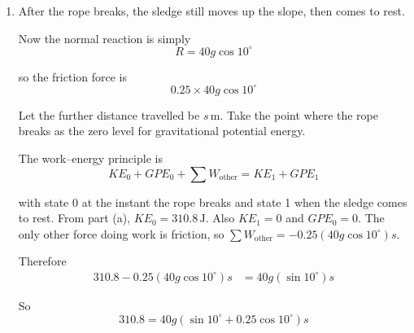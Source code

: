 \documentclass[leqno]{article}
\begin{document}
\begin{enumerate}[
  label=\textbf{\arabic*.},
  leftmargin=*,
  topsep=0pt,
  partopsep=0pt,
  parsep=0pt
]
\begin{djsSolution}
\begin{enumerate}[label=\textbf{(\alph*)}]
  So
  \begin{align*}
  0+0+220(5)\cos 15^\circ -0.25R(5)
  &= \frac12(40)v^2 + 40g(5)\sin 10^\circ
  \end{align*}

  Substituting \(R=40g\cos 10^\circ-220\sin 15^\circ\):
  \begin{align*}
  220(5)\cos 15^\circ -0.25\bigl(40g\cos 10^\circ-220\sin 15^\circ\bigr)(5)
  &= \frac12(40)v^2 + 40g(5)\sin 10^\circ
  \end{align*}

  Rearranging:
  \begin{align*}
  \frac12(40)v^2
  &=220(5)\cos 15^\circ-40g(5)\sin 10^\circ-0.25\bigl(40g\cos 10^\circ-220\sin 15^\circ\bigr)(5) \\
  &\approx 310.8\,\mathrm{J}
  \end{align*}

  Hence
  \[
  20v^2=310.8
  \]
  \[
  v^2=15.54
  \]
  \[
  v\approx 3.94\,\mathrm{m\,s^{-1}}
  \]

  While the rope is intact, all forces are constant, so the acceleration is constant. The resultant force is up the slope, so the speed increases until the rope breaks. Therefore this is the maximum speed.

  \item After the rope breaks, the sledge still moves up the slope, then comes to rest.

  Now the normal reaction is simply
  \[
  R=40g\cos 10^\circ
  \]

  so the friction force is
  \[
  0.25\times 40g\cos 10^\circ
  \]

  Let the further distance travelled be \(s\,\mathrm{m}\). Take the point where the rope breaks as the zero level for gravitational potential energy.

  The work--energy principle is
  \[
  KE_0+GPE_0+\sum W_{\text{other}}=KE_1+GPE_1
  \]

  with state 0 at the instant the rope breaks and state 1 when the sledge comes to rest. From part (a), \(KE_0=310.8\,\mathrm{J}\). Also \(KE_1=0\) and \(GPE_0=0\). The only other force doing work is friction, so \(\sum W_{\text{other}}=-0.25(40g\cos 10^\circ)s\).

  Therefore
  \begin{align*}
  310.8 - 0.25(40g\cos 10^\circ)s
  &= 40g(\sin 10^\circ)s
  \end{align*}

  So
  \[
  310.8 = 40g(\sin 10^\circ + 0.25\cos 10^\circ)s
  \]


\end{enumerate}
\end{djsSolution}
\end{enumerate}
\end{document}
